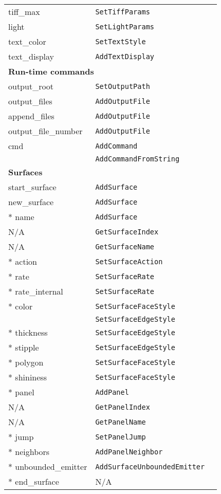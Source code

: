 \documentclass {book}
\newcommand {\ttt} {\texttt}
\begin{document}
\begin{longtable}[c]{lll}
tiff\_max & \ttt{SetTiffParams}\\
light & \ttt{SetLightParams}\\
text\_color & \ttt{SetTextStyle}\\
text\_display & \ttt{AddTextDisplay}\\
\hline
\multicolumn{3}{l}{\hspace{0.3in}\textbf{Run-time commands}}\\
\hline
output\_root & \ttt{SetOutputPath}\\
output\_files & \ttt{AddOutputFile}\\
append\_files & \ttt{AddOutputFile}\\
output\_file\_number & \ttt{AddOutputFile}\\
cmd & \ttt{AddCommand}\\
& \ttt{AddCommandFromString}\\
\hline
\multicolumn{3}{l}{\hspace{0.3in}\textbf{Surfaces}}\\
\hline
start\_surface & \ttt{AddSurface}\\
new\_surface & \ttt{AddSurface}\\
{*} name & \ttt{AddSurface}\\
N/A & \ttt{GetSurfaceIndex}\\
N/A & \ttt{GetSurfaceName}\\
{*} action & \ttt{SetSurfaceAction}\\
{*} rate & \ttt{SetSurfaceRate}\\
{*} rate\_internal & \ttt{SetSurfaceRate}\\
{*} color & \ttt{SetSurfaceFaceStyle}\\
& \ttt{SetSurfaceEdgeStyle}\\
{*} thickness & \ttt{SetSurfaceEdgeStyle}\\
{*} stipple & \ttt{SetSurfaceEdgeStyle}\\
{*} polygon & \ttt{SetSurfaceFaceStyle}\\
{*} shininess & \ttt{SetSurfaceFaceStyle}\\
{*} panel & \ttt{AddPanel}\\
N/A & \ttt{GetPanelIndex}\\
N/A & \ttt{GetPanelName}\\
{*} jump & \ttt{SetPanelJump}\\
{*} neighbors & \ttt{AddPanelNeighbor}\\
{*} unbounded\_emitter & \ttt{AddSurfaceUnboundedEmitter}\\
{*} end\_surface & N/A\\

\end{longtable}
\end{document}

